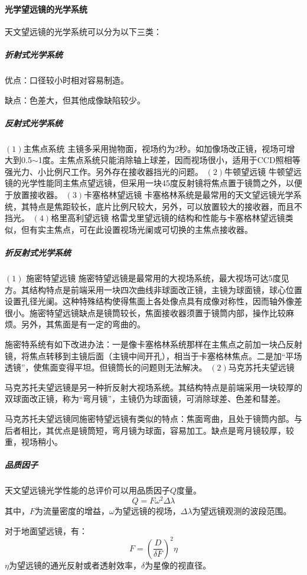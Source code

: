 \paragraph{光学望远镜的光学系统}
天文望远镜的光学系统可以分为以下三类：
\subparagraph{折射式光学系统}
优点：口径较小时相对容易制造。

缺点：色差大，但其他成像缺陷较少。
\subparagraph{反射式光学系统}
$\left(1\right)$主焦点系统
主镜多采用抛物面，视场约为2秒。如加像场改正镜，视场可增大到0.5$\sim$1度。主焦点系统只能消除轴上球差，因而视场很小，适用于CCD照相等强光力、小比例尺工作。另外存在接收器挡光的问题。
$\left(2\right)$牛顿望远镜
牛顿望远镜的光学性能同主焦点望远镜，但采用一块45度反射镜将焦点置于镜筒之外，以便于放置接收器。
$\left(3\right)$卡塞格林望远镜
卡塞格林系统是最常用的天文望远镜光学系统，其特点是焦距较长，底片比例尺较大，另外，可以放置较大的接收器，而且不挡光。
$\left(4\right)$格里高利望远镜 
格雷戈里望远镜的结构和性能与卡塞格林望远镜类似，但有实主焦点，可在此设置视场光阑或可切换的主焦点接收器。
\subparagraph{折反射式光学系统}
$\left(1\right)$ 施密特望远镜
施密特望远镜是最常用的大视场系统，最大视场可达5度见方。其结构特点是前端采用一块四次曲线非球面改正镜，主镜为球面镜，球心位置设置孔径光阑。这种特殊结构使得焦面上各处像点具有成像对称性，因而轴外像差很小。施密特望远镜缺点是镜筒较长，焦面接收器须置于镜筒内部，操作比较麻烦。另外，其焦面是有一定的弯曲的。

施密特系统有如下改进办法：一是像卡塞格林系统那样在主焦点之前加一块凸反射镜，将焦点转移到主镜后面（主镜中间开孔），相当于卡塞格林焦点。二是加“平场透镜”，使焦面变得平坦。但镜筒长的问题则无法解决。
$\left(2\right)$马克苏托夫望远镜

马克苏托夫望远镜是另一种折反射大视场系统。其结构特点是前端采用一块较厚的双球面改正镜，称为“弯月镜”，主镜仍为球面镜，可消除球差、色差和彗差。

马克苏托夫望远镜同施密特望远镜有类似的特点：焦面弯曲，且处于镜筒内部。与后者相比，其优点是镜筒短，弯月镜为球面，容易加工。缺点是弯月镜较厚，较重，视场稍小。
\subparagraph{品质因子}天文望远镜光学性能的总评价可以用品质因子$Q$度量。
\begin{equation}
	Q=F\omega^2\Delta \lambda 
\end{equation}
其中，$F$为流量密度的增益，$\omega$为望远镜的视场，$\Delta\lambda$为望远镜观测的波段范围。

对于地面望远镜，有：
\begin{equation}
	F=\left(\frac{D}{\delta F}\right)^2\eta
\end{equation}
$\eta$为望远镜的通光反射或者透射效率，$\delta$为星像的视直径。

